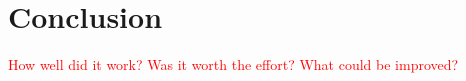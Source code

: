 \chapter{Conclusion}
\textcolor{red}{
How well did it work? Was it worth the effort? What could be improved?}